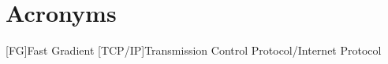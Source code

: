 \chapter{Acronyms}

\begin{acronym}
  [FG]{Fast Gradient}
  [TCP/IP]{Transmission Control Protocol/Internet Protocol}
\end{acronym}